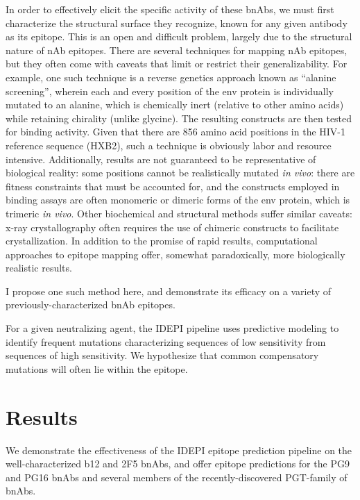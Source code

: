 \documentclass[10pt]{article}
\newcommand{\idepi}{{IDEPI}}
\newcommand{\hiv}{{HIV}-1}
\begin{document}
In order to effectively elicit the specific activity of these bnAbs,
we must first characterize the structural surface they recognize,
known for any given antibody as its epitope.
This is an open and difficult problem, largely due to the structural nature of nAb epitopes.
There are several techniques for mapping nAb epitopes, but they often come with caveats that limit or restrict their generalizability.
For example, one such technique is a reverse genetics approach known as “alanine screening”,
wherein each and every position of the env protein is individually mutated to an alanine,
which is chemically inert (relative to other amino acids) while retaining chirality (unlike glycine).
The resulting constructs are then tested for binding activity.
Given that there are 856 amino acid positions in the \hiv{} reference sequence ({HXB2}),
such a technique is obviously labor and resource intensive.
Additionally, results are not guaranteed to be representative of biological reality:
some positions cannot be realistically mutated \emph{in vivo}:
there are fitness constraints that must be accounted for,
and the constructs employed in binding assays are often monomeric or dimeric forms of the env protein, which is trimeric \emph{in vivo}.
Other biochemical and structural methods suffer similar caveats:
x-ray crystallography often requires the use of chimeric constructs to facilitate crystallization.
In addition to the promise of rapid results, computational approaches to epitope mapping offer, somewhat paradoxically, more biologically realistic results.

I propose one such method here, and demonstrate its efficacy on a variety of previously-characterized bnAb epitopes.

For a given neutralizing agent,
the \idepi{} pipeline uses predictive modeling to identify frequent mutations characterizing sequences of low sensitivity from sequences of high sensitivity.
We hypothesize that common compensatory mutations will often lie within the epitope.

\section*{Results}

We demonstrate the effectiveness of the \idepi{} epitope prediction pipeline on the well-characterized b12 and 2F5 bnAbs,
and offer epitope predictions for the PG9 and PG16 bnAbs and several members of the recently-discovered PGT-family of bnAbs.
\end{document}
